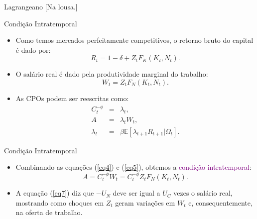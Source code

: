 \documentclass[10pt]{beamer}
\begin{document}
\begin{frame}{Lagrangeano}
    [Na lousa.]
\end{frame}

\begin{frame}{Condição Intratemporal}
    \begin{itemize}
        \item Como temos mercados perfeitamente competitivos, o retorno bruto do capital é dado por:
        \[
        R_t = 1 - \delta + Z_tF_K(K_t, N_t).
        \]
        \bigskip
        \item O salário real é dado pela produtividade marginal do trabalho:
        \[
        W_t = Z_t F_N(K_t, N_t).
        \]
        \bigskip
        \item As CPOs podem ser reescritas como:
        \begin{eqnarray}
            C_t^{-\phi} &=& \lambda_t, \label{eq4} \\
            A &=& \lambda_t W_t, \label{eq5} \\
            \lambda_t &=& \beta \mathbb{E}[\lambda_{t+1}R_{t+1}|\Omega_t]. \label{eq6}
        \end{eqnarray}
    \end{itemize}
\end{frame}

\begin{frame}{Condição Intratemporal}
    \begin{itemize}
        \item Combinando as equações (\ref{eq4}) e (\ref{eq5}), obtemos a \textcolor{purple}{condição intratemporal}:
        \begin{equation}
            A = C_t^{-\phi}W_t = C_t^{-\phi}Z_t F_N(K_t, N_t). \label{eq7}
        \end{equation}
        \bigskip
        \item A equação (\ref{eq7}) diz que $-U_N$ deve ser igual a $U_C$ vezes o salário real, mostrando como choques em $Z_t$ geram variações em $W_t$ e, consequentemente, na oferta de trabalho.
    \end{itemize}
\end{frame}
\end{document}
